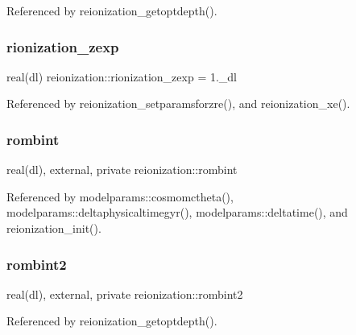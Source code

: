 Referenced by reionization\+\_\+getoptdepth().

\mbox{\label{namespacereionization_a55530d3d422131a11f47a02e17e4aba3}} 
\subsubsection{\texorpdfstring{rionization\+\_\+zexp}{rionization\_zexp}}
{\footnotesize\ttfamily real(dl) reionization\+::rionization\+\_\+zexp = 1.\+\_\+dl}



Referenced by reionization\+\_\+setparamsforzre(), and reionization\+\_\+xe().

\mbox{\label{namespacereionization_adb3b9c977f29d4636fa9cf724efd5979}} 
\subsubsection{\texorpdfstring{rombint}{rombint}}
{\footnotesize\ttfamily real(dl), external, private reionization\+::rombint\hspace{0.3cm}{\ttfamily [private]}}



Referenced by modelparams\+::cosmomctheta(), modelparams\+::deltaphysicaltimegyr(), modelparams\+::deltatime(), and reionization\+\_\+init().

\mbox{\label{namespacereionization_a415cf31bf0d6b1564808bbf7ee0b2c85}} 
\subsubsection{\texorpdfstring{rombint2}{rombint2}}
{\footnotesize\ttfamily real(dl), external, private reionization\+::rombint2\hspace{0.3cm}{\ttfamily [private]}}



Referenced by reionization\+\_\+getoptdepth().

\mbox{\label{namespacereionization_a3cd065cf1b3c5c33363c2d7e5d2443ba}} 
